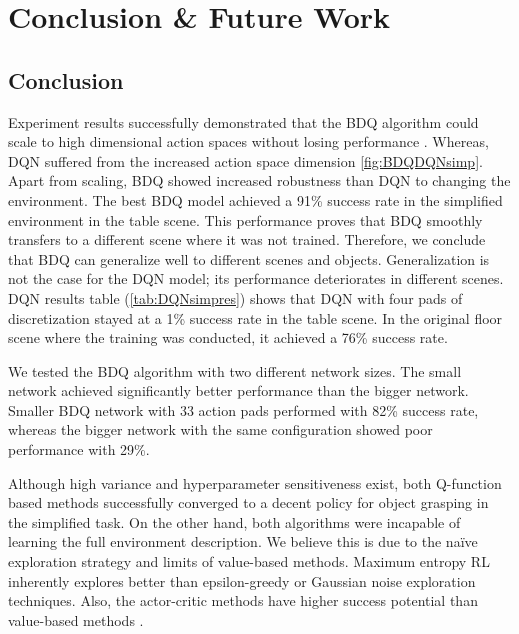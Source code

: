 
\chapter{Conclusion \& Future Work}\label{chapter:conclusion}

\section{Conclusion}


Experiment results successfully demonstrated that the BDQ algorithm could scale to high dimensional action spaces without losing performance \cite{Tavakoli2018}. Whereas, DQN suffered from the increased action space dimension \ref{fig:BDQDQNsimp}. Apart from scaling, BDQ showed increased robustness than DQN to changing the environment. The best BDQ model achieved a 91\% success rate in the simplified environment in the table scene. This performance proves that BDQ smoothly transfers to a different scene where it was not trained. Therefore, we conclude that BDQ can generalize well to different scenes and objects. Generalization is not the case for the DQN model; its performance deteriorates in different scenes. DQN results table (\ref{tab:DQNsimpres}) shows that DQN with four pads of discretization stayed at a 1\% success rate in the table scene. In the original floor scene where the training was conducted, it achieved a 76\% success rate.

We tested the BDQ algorithm with two different network sizes. The small network achieved significantly better performance than the bigger network. Smaller BDQ network with 33 action pads performed with 82\% success rate, whereas the bigger network with the same configuration showed poor performance with 29\%.

Although high variance and hyperparameter sensitiveness exist, both Q-function based methods successfully converged to a decent policy for object grasping in the simplified task. On the other hand, both algorithms were incapable of learning the full environment description. We believe this is due to the naïve exploration strategy and limits of value-based methods. Maximum entropy RL inherently explores better than epsilon-greedy or Gaussian noise exploration techniques. Also, the actor-critic methods have higher success potential than value-based methods \cite{Lillicrap2016}. 

